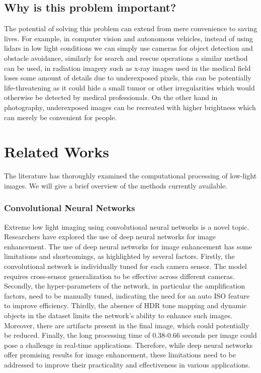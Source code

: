 \documentclass{article}
\begin{document}
\subsection{Why is this problem important?}
The potential of solving this problem can extend from mere convenience to saving lives. For example, in computer vision and autonomous vehicles, instead of using lidars in low light conditions we can simply use cameras for object detection and obstacle avoidance, similarly for search and rescue operations a similar method can be used, in radiation imagery such as x-ray images used in the medical field loses some amount of details due to underexposed pixels, this can be potentially life-threatening as it could hide a small tumor or other irregularities which would otherwise be detected by medical professionals. On the other hand in photography, underexposed images can be recreated with higher brightness which can merely be convenient for people.
\section{Related Works}

The literature has thoroughly examined the computational processing of low-light images. We will give a brief overview of the methods currently available.

\subsubsection{Convolutional Neural Networks} 
Extreme low light imaging using convolutional neural networks is a novel topic. Researchers have explored the use of deep neural networks \cite{LearningToSeeInTheDark} for image enhancement. The use of deep neural networks for image enhancement has some limitations and shortcomings, as highlighted by several factors. Firstly, the convolutional network is individually tuned for each camera sensor. The model requires cross-sensor generalization to be effective across different cameras. Secondly, the hyper-parameters of the network, in particular the amplification factors, need to be manually tuned, indicating the need for an auto ISO feature to improve efficiency. Thirdly, the absence of HDR tone mapping and dynamic objects in the dataset limits the network's ability to enhance such images. Moreover, there are artifacts present in the final image, which could potentially be reduced. Finally, the long processing time of 0.38-0.66 seconds per image could pose a challenge in real-time applications. Therefore, while deep neural networks offer promising results for image enhancement, these limitations need to be addressed to improve their practicality and effectiveness in various applications.
\end{document}
